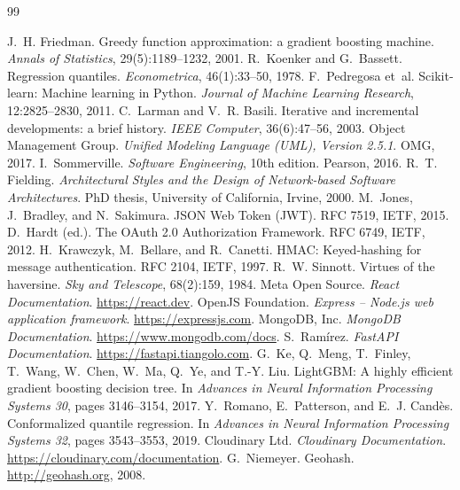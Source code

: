 \documentclass[11pt,letterpaper,oneside]{report}
\begin{document}
\begin{thebibliography}{99}
 J.~H. Friedman. Greedy function approximation: a gradient boosting machine.
  \emph{Annals of Statistics}, 29(5):1189--1232, 2001.
 R.~Koenker and G.~Bassett. Regression quantiles. \emph{Econometrica}, 46(1):33--50, 1978.
 F.~Pedregosa et~al. Scikit-learn: Machine learning in Python. \emph{Journal of Machine Learning
  Research}, 12:2825--2830, 2011.
 C.~Larman and V.~R. Basili. Iterative and incremental developments: a brief history.
  \emph{IEEE Computer}, 36(6):47--56, 2003.
 Object Management Group. \emph{Unified Modeling Language (UML), Version 2.5.1}. OMG, 2017.
 I.~Sommerville. \emph{Software Engineering}, 10th edition. Pearson, 2016.
 R.~T. Fielding. \emph{Architectural Styles and the Design of Network-based Software
  Architectures}. PhD thesis, University of California, Irvine, 2000.
 M.~Jones, J.~Bradley, and N.~Sakimura. JSON Web Token (JWT). RFC 7519, IETF, 2015.
 D.~Hardt (ed.). The OAuth 2.0 Authorization Framework. RFC 6749, IETF, 2012.
 H.~Krawczyk, M.~Bellare, and R.~Canetti. HMAC: Keyed-hashing for message authentication.
  RFC 2104, IETF, 1997.
 R.~W. Sinnott. Virtues of the haversine. \emph{Sky and Telescope}, 68(2):159, 1984.
 Meta Open Source. \emph{React Documentation}. \url{https://react.dev}.
 OpenJS Foundation. \emph{Express -- Node.js web application framework}. \url{https://expressjs.com}.
 MongoDB, Inc. \emph{MongoDB Documentation}. \url{https://www.mongodb.com/docs}.
 S.~Ram\'irez. \emph{FastAPI Documentation}. \url{https://fastapi.tiangolo.com}.
 G.~Ke, Q.~Meng, T.~Finley, T.~Wang, W.~Chen, W.~Ma, Q.~Ye, and T.-Y. Liu. LightGBM: A highly
  efficient gradient boosting decision tree. In \emph{Advances in Neural Information Processing Systems 30},
  pages 3146--3154, 2017.
 Y.~Romano, E.~Patterson, and E.~J. Cand\`es. Conformalized quantile regression. In
  \emph{Advances in Neural Information Processing Systems 32}, pages 3543--3553, 2019.
 Cloudinary Ltd. \emph{Cloudinary Documentation}. \url{https://cloudinary.com/documentation}.
 G.~Niemeyer. Geohash. \url{http://geohash.org}, 2008.
\end{thebibliography}
\end{document}

